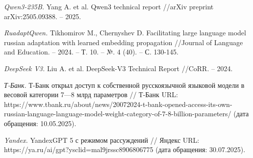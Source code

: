 \documentclass{article}
\begin{document}
\begin{thebibliography}{99}
\textit{Qwen3-235B.}
Yang A. et al. Qwen3 technical report //arXiv preprint arXiv:2505.09388. – 2025.

\textit{RuadaptQwen.}
Tikhomirov M., Chernyshev D. Facilitating large language model russian adaptation with learned embedding propagation //Journal of Language and Education. – 2024. – Т. 10. – №. 4 (40). – С. 130-145.

\textit{DeepSeek V3.}
Liu A. et al. DeepSeek-V3 Technical Report //CoRR. – 2024.

\textit{Т-Банк.}
Т-Банк открыл доступ к собственной русскоязычной языковой модели в весовой категории 7—8 млрд параметров 
// Т-Банк URL: https://www.tbank.ru/about/news/20072024-t-bank-opened-access-its-own-russian-language-language-model-weight-category-of-7-8-billion-parameters/ (дата обращения: 10.05.2025).

\textit{Yandex.}
YandexGPT 5 с режимом рассуждений // Яндекс URL: https://ya.ru/ai/gpt?ysclid=mal9jrssc8906806775 (дата обращения: 30.07.2025).

\end{thebibliography}

\renewcommand\refname{References}
\end{document}
